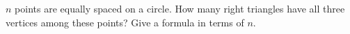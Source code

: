 $n$ points are equally spaced on a circle. How many right triangles have all three vertices among these points? Give a formula in terms of $n$.

